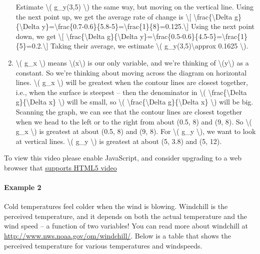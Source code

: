 \begin{enumerate}
  Estimate \textbackslash{}( g\_y(3,5) \textbackslash{}) the same way,
  but moving on the vertical line. Using the next point up, we get the
  average rate of change is \textbackslash{}{[}
  \textbackslash{}frac\{\textbackslash{}Delta g\}\{\textbackslash{}Delta
  y\}=\textbackslash{}frac\{0.7-0.6\}\{5.8-5\}=\textbackslash{}frac\{1\}\{8\}=0.125.\textbackslash{}{]}
  Using the next point down, we get \textbackslash{}{[}
  \textbackslash{}frac\{\textbackslash{}Delta g\}\{\textbackslash{}Delta
  y\}=\textbackslash{}frac\{0.5-0.6\}\{4.5-5\}=\textbackslash{}frac\{1\}\{5\}=0.2.\textbackslash{}{]}
  Taking their average, we estimate \textbackslash{}(
  g\_y(3,5)\textbackslash{}approx 0.1625 \textbackslash{}).
\item
  \textbackslash{}( g\_x \textbackslash{}) means
  \textbackslash{}(x\textbackslash{}) is our only variable, and we're
  thinking of \textbackslash{}(y\textbackslash{}) as a constant. So
  we're thinking about moving across the diagram on horizontal lines.
  \textbackslash{}( g\_x \textbackslash{}) will be greatest when the
  contour lines are closest together, i.e., when the surface is steepest
  -- then the denominator in \textbackslash{}(
  \textbackslash{}frac\{\textbackslash{}Delta g\}\{\textbackslash{}Delta
  x\} \textbackslash{}) will be small, so \textbackslash{}(
  \textbackslash{}frac\{\textbackslash{}Delta g\}\{\textbackslash{}Delta
  x\} \textbackslash{}) will be big. Scanning the graph, we can see that
  the contour lines are closest together when we head to the left or to
  the right from about (0.5, 8) and (9, 8). So \textbackslash{}( g\_x
  \textbackslash{}) is greatest at about (0.5, 8) and (9, 8). For
  \textbackslash{}( g\_y \textbackslash{}), we want to look at vertical
  lines. \textbackslash{}( g\_y \textbackslash{}) is greatest at about
  (5, 3.8) and (5, 12).
\end{enumerate}

To view this video please enable JavaScript, and consider upgrading to a
web browser that \href{http://videojs.com/html5-video-support/}{supports
HTML5 video}

\hypertarget{example-2}{%
\paragraph{Example 2}\label{example-2}}

Cold temperatures feel colder when the wind is blowing. Windchill is the
perceived temperature, and it depends on both the actual temperature and
the wind speed -- a function of two variables! You can read more about
windchill at \url{http://www.nws.noaa.gov/om/windchill/}. Below is a
table that shows the perceived temperature for various temperatures and
windspeeds.

